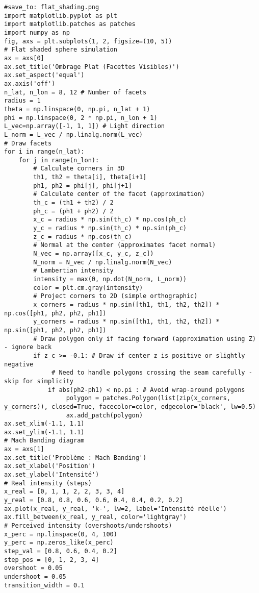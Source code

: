 \begin{verbatim}
#save_to: flat_shading.png
import matplotlib.pyplot as plt
import matplotlib.patches as patches
import numpy as np
fig, axs = plt.subplots(1, 2, figsize=(10, 5))
# Flat shaded sphere simulation
ax = axs[0]
ax.set_title('Ombrage Plat (Facettes Visibles)')
ax.set_aspect('equal')
ax.axis('off')
n_lat, n_lon = 8, 12 # Number of facets
radius = 1
theta = np.linspace(0, np.pi, n_lat + 1)
phi = np.linspace(0, 2 * np.pi, n_lon + 1)
L_vec=np.array([-1, 1, 1]) # Light direction
L_norm = L_vec / np.linalg.norm(L_vec)
# Draw facets
for i in range(n_lat):
    for j in range(n_lon):
        # Calculate corners in 3D
        th1, th2 = theta[i], theta[i+1]
        ph1, ph2 = phi[j], phi[j+1]
        # Calculate center of the facet (approximation)
        th_c = (th1 + th2) / 2
        ph_c = (ph1 + ph2) / 2
        x_c = radius * np.sin(th_c) * np.cos(ph_c)
        y_c = radius * np.sin(th_c) * np.sin(ph_c)
        z_c = radius * np.cos(th_c)
        # Normal at the center (approximates facet normal)
        N_vec = np.array([x_c, y_c, z_c])
        N_norm = N_vec / np.linalg.norm(N_vec)
        # Lambertian intensity
        intensity = max(0, np.dot(N_norm, L_norm))
        color = plt.cm.gray(intensity)
        # Project corners to 2D (simple orthographic)
        x_corners = radius * np.sin([th1, th1, th2, th2]) * np.cos([ph1, ph2, ph2, ph1])
        y_corners = radius * np.sin([th1, th1, th2, th2]) * np.sin([ph1, ph2, ph2, ph1])
        # Draw polygon only if facing forward (approximation using Z) - ignore back
        if z_c >= -0.1: # Draw if center z is positive or slightly negative
             # Need to handle polygons crossing the seam carefully - skip for simplicity
            if abs(ph2-ph1) < np.pi : # Avoid wrap-around polygons
                 polygon = patches.Polygon(list(zip(x_corners, y_corners)), closed=True, facecolor=color, edgecolor='black', lw=0.5)
                 ax.add_patch(polygon)
ax.set_xlim(-1.1, 1.1)
ax.set_ylim(-1.1, 1.1)
# Mach Banding diagram
ax = axs[1]
ax.set_title('Problème : Mach Banding')
ax.set_xlabel('Position')
ax.set_ylabel('Intensité')
# Real intensity (steps)
x_real = [0, 1, 1, 2, 2, 3, 3, 4]
y_real = [0.8, 0.8, 0.6, 0.6, 0.4, 0.4, 0.2, 0.2]
ax.plot(x_real, y_real, 'k-', lw=2, label='Intensité réelle')
ax.fill_between(x_real, y_real, color='lightgray')
# Perceived intensity (overshoots/undershoots)
x_perc = np.linspace(0, 4, 100)
y_perc = np.zeros_like(x_perc)
step_val = [0.8, 0.6, 0.4, 0.2]
step_pos = [0, 1, 2, 3, 4]
overshoot = 0.05
undershoot = 0.05
transition_width = 0.1

\end{verbatim}

